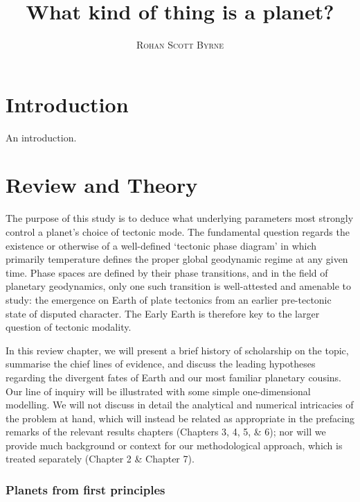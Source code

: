\documentclass[a4paper,11pt,oneside]{book}
\title{\Huge \textbf{What kind of thing is a planet?}}
\author{\textsc{Rohan Scott Byrne}}
\renewcommand{\section}[1]{\chapter{#1}}
\begin{document}
\sloppy

\frontmatter
\maketitle

\tableofcontents

\mainmatter

% 
% 

\section{Introduction}

An introduction.

\section{Review and Theory}

The purpose of this study is to deduce what underlying parameters most strongly control a planet's choice of tectonic mode. The fundamental question regards the existence or otherwise of a well-defined `tectonic phase diagram' in which primarily temperature defines the proper global geodynamic regime at any given time. Phase spaces are defined by their phase transitions, and in the field of planetary geodynamics, only one such transition is well-attested and amenable to study: the emergence on Earth of plate tectonics from an earlier pre-tectonic state of disputed character. The Early Earth is therefore key to the larger question of tectonic modality.

In this review chapter, we will present a brief history of scholarship on the topic, summarise the chief lines of evidence, and discuss the leading hypotheses regarding the divergent fates of Earth and our most familiar planetary cousins. Our line of inquiry will be illustrated with some simple one-dimensional modelling. We will not discuss in detail the analytical and numerical intricacies of the problem at hand, which will instead be related as appropriate in the prefacing remarks of the relevant results chapters (Chapters 3, 4, 5, \& 6); nor will we provide much background or context for our methodological approach, which is treated separately (Chapter 2 \& Chapter 7).

\subsection{Planets from first principles}
\end{document}
